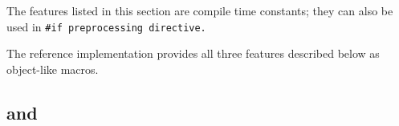 The features listed in this section are compile time constants;
they can also be used in \tt{#if} preprocessing directive.

\note The reference implementation provides all
three features described below as object-like macros.

\subsection{ and }


\subsection{}

